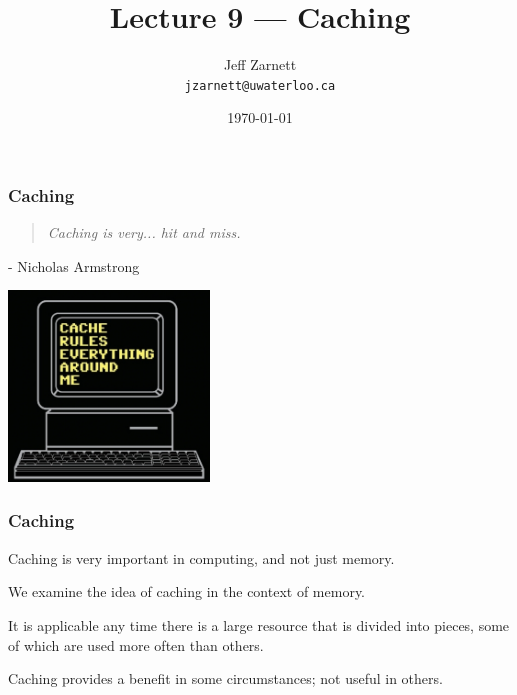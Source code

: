 

\title{Lecture 9 --- Caching }

\author{Jeff Zarnett \\ \small \texttt{jzarnett@uwaterloo.ca}}
\date{\today}




\begin{frame}
  \titlepage

 \end{frame}

\begin{frame}
\frametitle{Caching}

\vspace{5em}

\begin{quote}
\textit{Caching is very... hit and miss.}
\end{quote}
\hfill - Nicholas Armstrong

\begin{center}
	\includegraphics[width=0.4\textwidth]{images/cacherules.jpg}
\end{center}

\end{frame}

\begin{frame}
\frametitle{Caching}

Caching is very important in computing, and not just memory. 

We examine the idea of caching in the context of memory.

It is applicable any time there is a large resource that is divided into pieces, some of which are used more often than others. 

Caching provides a benefit in some circumstances; not useful in others. 


\end{frame}

